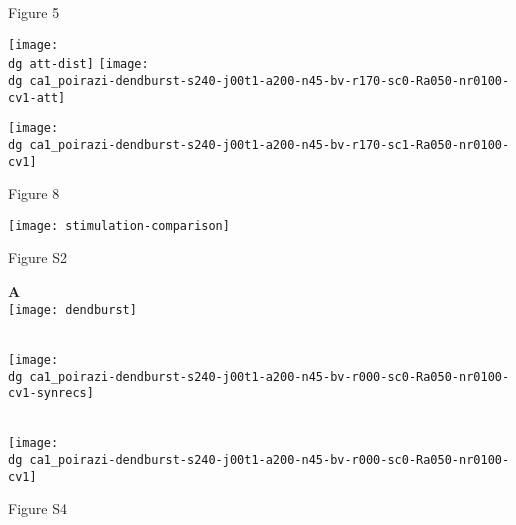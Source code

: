 \documentclass{article}
\newcommand{\dg}{}              %
\newlength{\colwidth}
\newcommand{\figtitle}[1]{}
\begin{document}
\pagebreak[4]

Figure 5

\pagebreak[4]

\figtitle{Figure 6}

\vspace{\baselineskip}

\noindent\texttt{[image: \\dg att-dist]}
\texttt{[image: \\dg ca1\_poirazi-dendburst-s240-j00t1-a200-n45-bv-r170-sc0-Ra050-nr0100-cv1-att]}


\pagebreak[4]

\figtitle{Figure 7}

\vspace{\baselineskip}
\texttt{[image: \\dg ca1\_poirazi-dendburst-s240-j00t1-a200-n45-bv-r170-sc1-Ra050-nr0100-cv1]}

\pagebreak[4]

Figure 8

\pagebreak[4]
\figtitle{Figure S1}

\texttt{[image: stimulation-comparison]}

\pagebreak[4]

Figure S2

\pagebreak[4]

\figtitle{Figure S3}

\noindent
\begin{minipage}[t]{0.5\colwidth}
  \textbf{A}\\
    \texttt{[image: dendburst]}
\end{minipage}
\begin{minipage}[t]{0.5\colwidth}
  \mbox{}\\[-0.5\baselineskip]
  \texttt{[image: \\dg ca1\_poirazi-dendburst-s240-j00t1-a200-n45-bv-r000-sc0-Ra050-nr0100-cv1-synrecs]}  
\end{minipage}\\
\noindent\texttt{[image: \\dg ca1\_poirazi-dendburst-s240-j00t1-a200-n45-bv-r000-sc0-Ra050-nr0100-cv1]}

\pagebreak[4]

Figure S4
\end{document}
